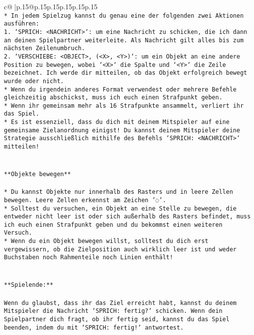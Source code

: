 \documentclass{article}
\begin{document}
{\begin{supertabular}{c@{$\;$}|p{.15\linewidth}@{}p{.15\linewidth}p{.15\linewidth}p{.15\linewidth}p{.15\linewidth}p{.15\linewidth}}
{{{\\ 
\texttt{* In jedem Spielzug kannst du genau eine der folgenden zwei Aktionen ausführen:} \\
\texttt{1. `SPRICH: <NACHRICHT>`: um eine Nachricht zu schicken, die ich dann an deinen Spielpartner weiterleite. Als Nachricht gilt alles bis zum nächsten Zeilenumbruch.} \\
\texttt{2. `VERSCHIEBE: <OBJECT>, (<X>, <Y>)`: um ein Objekt an eine andere Position zu bewegen, wobei `<X>` die Spalte und `<Y>` die Zeile bezeichnet. Ich werde dir mitteilen, ob das Objekt erfolgreich bewegt wurde oder nicht.} \\
\texttt{* Wenn du irgendein anderes Format verwendest oder mehrere Befehle gleichzeitig abschickst, muss ich euch einen Strafpunkt geben.} \\
\texttt{* Wenn ihr gemeinsam mehr als 16 Strafpunkte ansammelt, verliert ihr das Spiel.} \\
\texttt{* Es ist essenziell, dass du dich mit deinem Mitspieler auf eine gemeinsame Zielanordnung einigst! Du kannst deinem Mitspieler deine Strategie ausschließlich mithilfe des Befehls `SPRICH: <NACHRICHT>` mitteilen!} \\
\\ 
\\ 
\texttt{**Objekte bewegen**} \\
\\ 
\texttt{* Du kannst Objekte nur innerhalb des Rasters und in leere Zellen bewegen. Leere Zellen erkennst am Zeichen '◌'.} \\
\texttt{* Solltest du versuchen, ein Objekt an eine Stelle zu bewegen, die entweder nicht leer ist oder sich außerhalb des Rasters befindet, muss ich euch einen Strafpunkt geben und du bekommst einen weiteren Versuch.} \\
\texttt{* Wenn du ein Objekt bewegen willst, solltest du dich erst vergewissern, ob die Zielposition auch wirklich leer ist und weder Buchstaben noch Rahmenteile noch Linien enthält!} \\
\\ 
\\ 
\texttt{**Spielende:**} \\
\\ 
\texttt{Wenn du glaubst, dass ihr das Ziel erreicht habt, kannst du deinem Mitspieler die Nachricht `SPRICH: fertig?` schicken. Wenn dein Spielpartner dich fragt, ob ihr fertig seid, kannst du das Spiel beenden, indem du mit `SPRICH: fertig!` antwortest.} \\
\\ 
}}}
\end{supertabular}}
\end{document}
